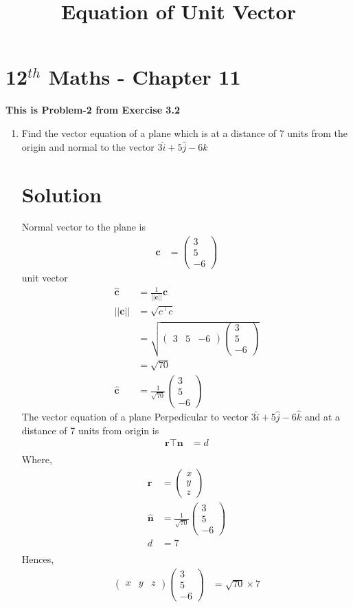 \documentclass[12pt]{article}
\newcommand{\myvec}[1]{\ensuremath{\begin{pmatrix}#1\end{pmatrix}}}
\let\vec\mathbf
\begin{document}
\begin{center}
\title{\textbf{Equation  of Unit Vector}}
\date{\vspace{-5ex}} %
\maketitle
\end{center}
\setcounter{page}{1}
\section{12$^{th}$ Maths - Chapter 11}
\textbf{This is Problem-2 from Exercise 3.2}
\begin{enumerate}
\item Find the vector equation of a plane which is at a distance of 7 units from the origin and normal to the vector $3\hat{i}+5\hat{j}-6\hat{k}$
\section{Solution}
Normal vector to the plane is
\begin{align} 
\vec{c}&=\myvec{3\\5\\-6}
\end{align}
unit vector 
\begin{align}
\hat{\vec{c}}&=\frac{1}{||\vec{c}||}\vec{c}\\
{||\vec{c}||}&=\sqrt{c^\top c}\\
&=\sqrt{\myvec{3& 5& -6}\myvec{3\\5\\-6}}\\
&=\sqrt{70}\\
\hat{\vec{c}}&=\frac{1}{\sqrt{70}}\myvec{3\\5\\-6}
\end{align}
The vector equation of a plane Perpedicular to vector $3\hat{i}+5\hat{j}-6\hat{k}$ and at a distance of 7 units from origin is
\begin{align}
\vec{r\top}\vec{n}&=d\\
\end{align}
Where,
\begin{align}
\vec{r}&=\myvec{x\\y\\z}\\
\hat{\vec{n}}&=\frac{1}{\sqrt{70}}\myvec{3\\5\\-6}\\
d&=7\\
\end{align}
Hences,
\begin{align}
\myvec{x&y&z}\myvec{3\\5\\-6}&=\sqrt{70}\times7
\end{align}	 		  
\end{enumerate} 
\end{document}
